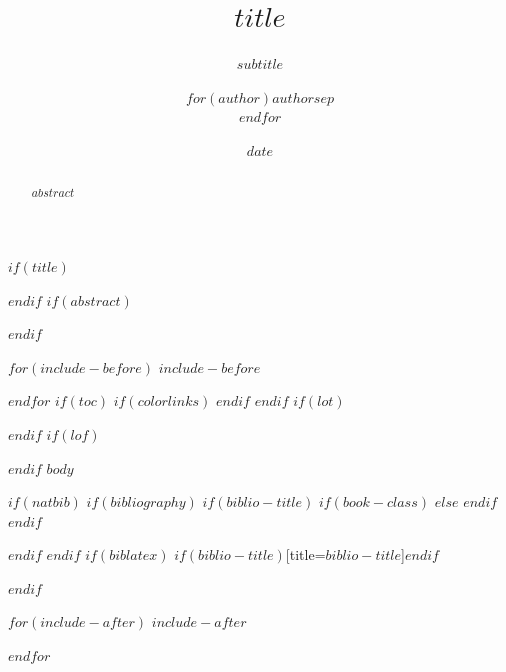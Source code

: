 \documentclass[$if(fontsize)$$fontsize$,$endif$$if(lang)$$babel-lang$,$endif$$if(papersize)$$papersize$paper,$endif$$for(classoption)$$classoption$$sep$,$endfor$]{$documentclass$}
\title{$title$}
\title{}
\subtitle{$subtitle$}
\author{$for(author)$$author$$sep$ \\ $endfor$}
\author{}
\date{$date$}
\date{}
\begin{document}
$if(title)$
\maketitle
$endif$
$if(abstract)$
\begin{abstract}
$abstract$
\end{abstract}
$endif$

$for(include-before)$
$include-before$

$endfor$
$if(toc)$
{
$if(colorlinks)$
\hypersetup{linkcolor=$if(toccolor)$$toccolor$$else$black$endif$}
$endif$
\setcounter{tocdepth}{$toc-depth$}
\tableofcontents
}
$endif$
$if(lot)$
\listoftables
$endif$
$if(lof)$
\listoffigures
$endif$
$body$

$if(natbib)$
$if(bibliography)$
$if(biblio-title)$
$if(book-class)$
\renewcommand\bibname{$biblio-title$}
$else$
\renewcommand\refname{$biblio-title$}
$endif$
$endif$


$endif$
$endif$
$if(biblatex)$
\printbibliography$if(biblio-title)$[title=$biblio-title$]$endif$

$endif$

$for(include-after)$
$include-after$

$endfor$
\end{document}
